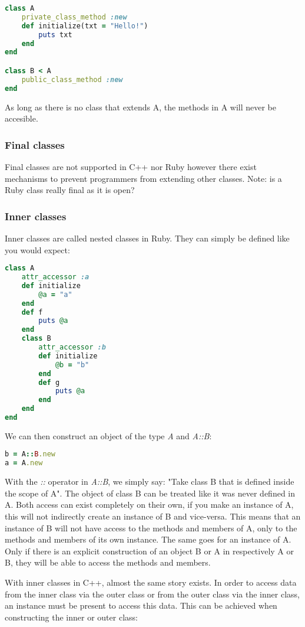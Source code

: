 \documentclass[10pt,a4paper,twocolumn]{article}
\begin{document}
\begin{lstlisting}[language=Ruby]
class A
	private_class_method :new
	def initialize(txt = "Hello!")
		puts txt
	end
end

class B < A
	public_class_method :new
end
\end{lstlisting}

As long as there is no class that extends A, the methods in A will never be accesible.

\subsubsection{Final classes}
Final classes are not supported in C++ nor Ruby however there exist mechanisms to prevent programmers from extending other classes. Note: is a Ruby class really final as it is open?

\subsubsection{Inner classes}
Inner classes are called nested classes in Ruby. They can simply be defined like you would expect:

\begin{lstlisting}[language=Ruby]
class A
	attr_accessor :a
	def initialize
		@a = "a"
	end
	def f
		puts @a
	end
	class B
		attr_accessor :b
		def initialize 
			@b = "b"
		end
		def g
			puts @a
		end
	end
end
\end{lstlisting}

We can then construct an object of the type \textit{A} and \textit{A::B}:

\begin{lstlisting}[language=Ruby]
b = A::B.new
a = A.new
\end{lstlisting}

With the \textit{::} operator in \textit{A::B}, we simply say: "Take class B that is defined inside the scope of A". The object of class B can be treated like it was never defined in A. Both access can exist completely on their own, if you make an instance of A, this will not indirectly create an instance of B and vice-versa. This means that an instance of B will not have access to the methods and members of A, only to the methods and members of its own instance. The same goes for an instance of A. Only if there is an explicit construction of an object B or A in respectively A or B, they will be able to access the methods and members.

With inner classes in C++, almost the same story exists. In order to access data from the inner class via the outer class or from the outer class via the inner class, an instance must be present to access this data. This can be achieved when constructing the inner or outer class:
\end{document}

